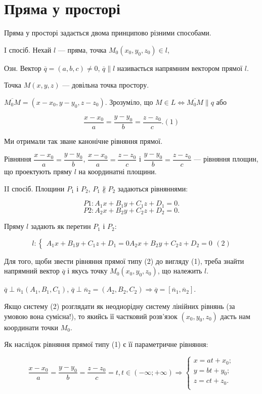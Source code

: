 \section{Пряма у просторі}


Пряма у просторі задається двома принципово різними способами.

I спосіб. Нехай $l$ --- пряма, точка $M_0(x_0,y_0,z_0) \in l$,


Озн. Вектор $\overline{q} = (a,b,c) \neq 0$, $\overline{q} \parallel l$ називається напрямним вектором
прямої $l$.

Точка $M(x,y,z)$ --- довільна точка простору.


$\overline{M_0M} = (x-x_0,y-y_0,z-z_0)$.
Зрозуміло, що $M \in L \Leftrightarrow \overline{M_0M} \parallel q$ або

$$\dfrac{x-x_0}{a} = \dfrac{y-y_0}{b} = \dfrac{z-z_0}{c}.(1)$$

Ми отримали так зване канонічне
рівняння прямої.


Рівняння $\dfrac{x-x_0}{a} = \dfrac{y-y_0}{b}$, $\dfrac{x-x_0}{a} = \dfrac{z-z_0}{c}$
і $\dfrac{y-y_0}{b} = \dfrac{z-z_0}{c}$ --- рівняння
площин, що проектують пряму $l$ на координатні площини.

II спосіб. Площини $P_1$ і $P_2$, $P_1 \nparallel P_2$ задаються рівняннями:

$$P1: A_1x + B_1y + C_1z + D_1 = 0.$$
$$P2: A_2x + B_2y + C_2z + D_2 = 0.$$

Пряму $l$ задають як перетин $P_1$ і $P_2$:

$$l: \left\{ \begin{matrix}
	A_1x + B_1y + C_1z + D_1 = 0
	A_2x + B_2y + C_2z + D_2 = 0
\end{matrix} \right. (2)$$


Для того, щоби звести рівняння прямої типу (2) до вигляду (1), треба
знайти напрямний вектор $\overline{q}$ і якусь точку $M_0(x_0,y_0,z_0)$, що належить $l$.

$\overline{q} \perp \overline{n}_1(A_1,B_1,C_1)$, $\overline{q} \perp \overline{n}_2 = (A_2,B_2,C_2) \Rightarrow \overline{q} = [\overline{n}_1,\overline{n}_2].$


Якщо систему (2) розглядати як неоднорідну систему лінійних рівнянь
(за умовою вона сумісна!), то якийсь її частковий розв’язок $(x_0,y_0,z_0)$ дасть
нам координати точки $M_0$.

Як наслідок рівняння прямої типу (1) є її параметричне рівняння:

$$\dfrac{x-x_0}{a} = \dfrac{y-y_0}{b} = \dfrac{z-z_0}{c} = t, t \in (-\infty;+\infty) \Rightarrow 
\left\{ \begin{matrix}
	x = at +x_0; \\
	y = bt +y_0; \\
	z = ct +z_0. \\
\end{matrix} \right.$$


